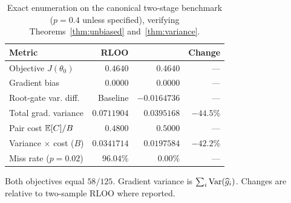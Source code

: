 \begin{table}[t]
\centering
\begingroup
\fontsize{8}{9.5}\selectfont
\setlength{\tabcolsep}{2pt}
\renewcommand{\arraystretch}{1.18}
\begin{tabular*}{\columnwidth}{@{\extracolsep{\fill}}lrrr@{}}
\toprule
\textbf{Metric} & \textbf{RLOO} & \textbf{\prism{}} & \textbf{Change} \\
\midrule
Objective $J(\theta_0)$ & $0.4640$ & $0.4640$ & --- \\
Gradient bias & $0.0000$ & $\mathbf{0.0000}$ & --- \\
Root-gate var. diff. & Baseline & $\mathbf{-0.0164736}$ & --- \\
\addlinespace[2pt]
Total grad. variance & $0.0711904$ & $\mathbf{0.0395168}$ & $-44.5\%$ \\
Pair cost $\mathbb{E}[C]/B$ & $0.4800$ & $0.5000$ & --- \\
Variance $\times$ cost ($B$) & $0.0341714$ & $\mathbf{0.0197584}$ & $-42.2\%$ \\
\addlinespace[2pt]
Miss rate ($p=0.02$) & $96.04\%$ & $\mathbf{0.00\%}$ & --- \\
\bottomrule
\end{tabular*}
\par\vspace{3pt}
\parbox{\columnwidth}{\fontsize{7}{8.5}\selectfont\color{ResultMuted}
Both objectives equal $58/125$. Gradient variance is $\sum_i\operatorname{Var}(\widehat{g}_i)$. Changes are relative to two-sample RLOO where reported.}
\endgroup
\caption{Exact enumeration on the canonical two-stage benchmark ($p=0.4$ unless specified), verifying Theorems~\ref{thm:unbiased} and~\ref{thm:variance}.}
\label{tab:exact_verification}
\end{table}
